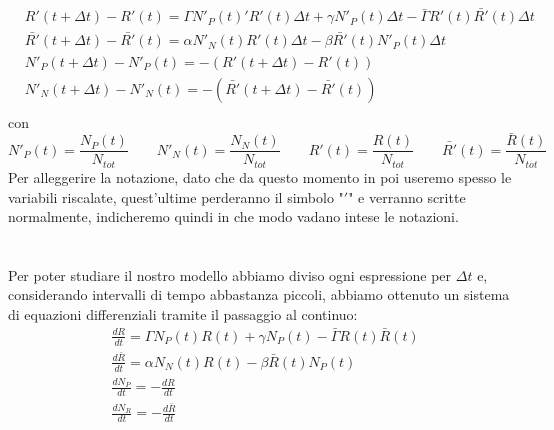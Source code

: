 \begin{equation} \label{eq: 1.3}
	\begin{aligned}
		&R'(t+\Delta t)-R'(t)=\Gamma N'_P(t)'R'(t)\Delta t+\gamma N'_P(t)\Delta t-\bar{\Gamma}R'(t)\bar{R'}(t)\Delta t\\
	&\bar{R'}(t+\Delta t)-\bar{R'}(t)=\alpha N'_N(t)R'(t)\Delta t-\beta \bar{R'}(t)N'_P(t)\Delta t\\
	&N'_P(t+\Delta t)-N'_P(t)=-(R'(t+\Delta t)-R'(t))\\
	&N'_N(t+\Delta t)-N'_N(t)=-(\bar{R'}(t+\Delta t)-\bar{R'}(t))\\
	\end{aligned}
\end{equation}	
con 
\begin{equation*}
	N'_{P}(t)=\frac{N_{P}(t)}{N_{tot}} \qquad 	N'_{N}(t)=\frac{N_{N}(t)}{N_{tot}} \qquad	R'(t)=\frac{R(t)}{N_{tot}} \qquad	\bar{R'}(t)=\frac{\bar{R}(t)}{N_{tot}} 
\end{equation*}
Per alleggerire la notazione, dato che da questo momento in poi useremo spesso le variabili riscalate, quest'ultime perderanno il simbolo "$ ' $" e verranno scritte normalmente, indicheremo quindi in che modo vadano intese le notazioni. \\
%
\\\\ 
Per poter studiare il nostro modello abbiamo diviso ogni espressione per $ \Delta t $ e, considerando intervalli di tempo abbastanza piccoli, abbiamo ottenuto un sistema di equazioni differenziali tramite il passaggio al continuo:
\begin{equation} \label{eq:1.4}
		\begin{aligned}
			&\frac{dR}{dt}=\Gamma N_P(t) R(t)+\gamma N_P(t)-\bar{\Gamma}R(t)\bar{R}(t)\\
		&\frac{d\bar{R}}{dt}=\alpha N_N(t)R(t)-\beta \bar{R}(t)N_P(t)\\
		&\frac{dN_{P}}{dt}= -\frac{dR}{dt}\\
		&\frac{dN_{R}}{dt}= -\frac{d\bar{R}}{dt}\\
		\end{aligned}
\end{equation}
